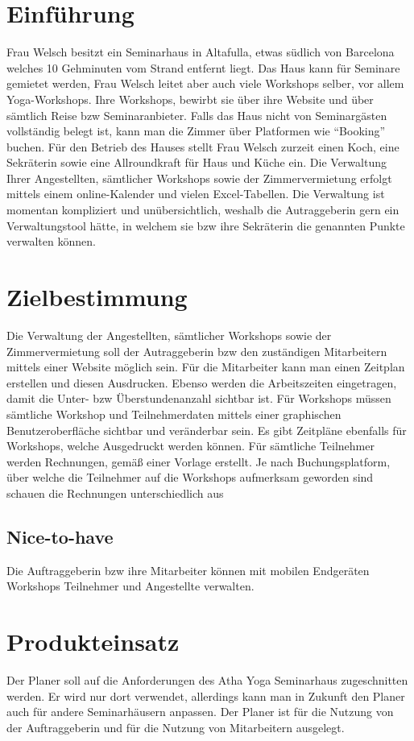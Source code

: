 


\section{Einführung}
Frau Welsch besitzt ein Seminarhaus in Altafulla, etwas südlich von Barcelona welches 10 Gehminuten vom Strand entfernt liegt. Das Haus kann für Seminare gemietet werden, Frau Welsch leitet aber auch viele Workshops selber, vor allem Yoga-Workshops. Ihre Workshops, bewirbt sie über ihre Website und über sämtlich Reise bzw Seminaranbieter. Falls das Haus nicht von Seminargästen vollständig belegt ist, kann man die Zimmer über Platformen wie ``Booking'' buchen. Für den Betrieb des Hauses stellt Frau Welsch zurzeit einen Koch, eine Sekräterin sowie eine Allroundkraft für Haus und Küche ein. Die Verwaltung Ihrer Angestellten, sämtlicher Workshops sowie der Zimmervermietung erfolgt mittels einem online-Kalender und vielen Excel-Tabellen. Die Verwaltung ist momentan kompliziert und unübersichtlich, weshalb die Autraggeberin gern ein Verwaltungstool hätte, in welchem sie bzw ihre Sekräterin die genannten Punkte verwalten können.

\section{Zielbestimmung}
Die Verwaltung der Angestellten, sämtlicher Workshops sowie der Zimmervermietung soll der Autraggeberin bzw den zuständigen Mitarbeitern mittels einer Website möglich sein. Für die Mitarbeiter kann man einen Zeitplan erstellen und diesen Ausdrucken. Ebenso werden die Arbeitszeiten eingetragen, damit die Unter- bzw Überstundenanzahl sichtbar ist. Für Workshops müssen sämtliche Workshop und Teilnehmerdaten mittels einer graphischen Benutzeroberfläche sichtbar und veränderbar sein. Es gibt  Zeitpläne ebenfalls für Workshops, welche Ausgedruckt werden können. Für sämtliche Teilnehmer werden Rechnungen, gemäß einer Vorlage erstellt. Je nach Buchungsplatform, über welche die Teilnehmer auf die Workshops aufmerksam geworden sind schauen die Rechnungen unterschiedlich aus
\subsection*{Nice-to-have}
Die Auftraggeberin bzw ihre Mitarbeiter können mit mobilen Endgeräten Workshops Teilnehmer und Angestellte verwalten.

\section{Produkteinsatz}
Der Planer soll auf die Anforderungen des Atha Yoga Seminarhaus zugeschnitten werden. Er wird nur dort verwendet, allerdings kann man in Zukunft den Planer auch für andere Seminarhäusern anpassen. Der Planer ist für die Nutzung von der Auftraggeberin und für die Nutzung von Mitarbeitern ausgelegt.



